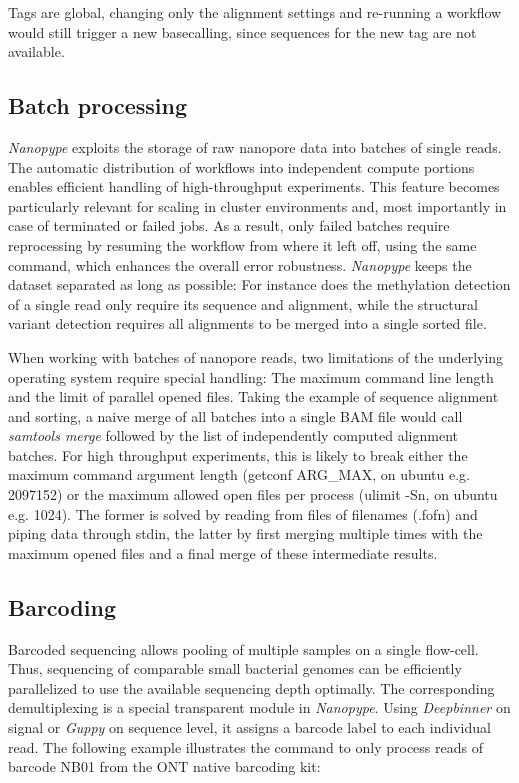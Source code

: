 Tags are global, changing only the alignment settings and re-running a workflow would still trigger a new basecalling, since sequences for the new tag are not available. 


\subsection{Batch processing}
\label{subsec:nanopype:batchprocessing}

\textit{Nanopype} exploits the storage of raw nanopore data into batches of single reads. The automatic distribution of workflows into independent compute portions enables efficient handling of high-throughput experiments. This feature becomes particularly relevant for scaling in cluster environments and, most importantly in case of terminated or failed jobs. As a result, only failed batches require reprocessing by resuming the workflow from where it left off, using the same command, which enhances the overall error robustness. 
\textit{Nanopype} keeps the dataset separated as long as possible: For instance does the methylation detection of a single read only require its sequence and alignment, while the structural variant detection requires all alignments to be merged into a single sorted file.

When working with batches of nanopore reads, two limitations of the underlying operating system require special handling: The maximum command line length and the limit of parallel opened files. Taking the example of sequence alignment and sorting, a naive merge of all batches into a single BAM file would call \textit{samtools merge} followed by the list of independently computed alignment batches. For high throughput experiments, this is likely to break either the maximum command argument length (getconf ARG\_MAX, on ubuntu e.g. 2097152) or the maximum allowed open files per process (ulimit -Sn, on ubuntu e.g. 1024). The former is solved by reading from files of filenames (.fofn) and piping data through stdin, the latter by first merging multiple times with the maximum opened files and a final merge of these intermediate results.


\subsection{Barcoding}
\label{subsec:nanopype:barcoding}
Barcoded sequencing allows pooling of multiple samples on a single flow-cell. Thus, sequencing of comparable small bacterial genomes can be efficiently parallelized to use the available sequencing depth optimally. The corresponding demultiplexing is a special transparent module in \textit{Nanopype}. Using \textit{Deepbinner} \cite{Wick2018} on signal or \textit{Guppy} on sequence level, it assigns a barcode label to each individual read.  The following example illustrates the command to only process reads of barcode NB01 from the ONT native barcoding kit:

